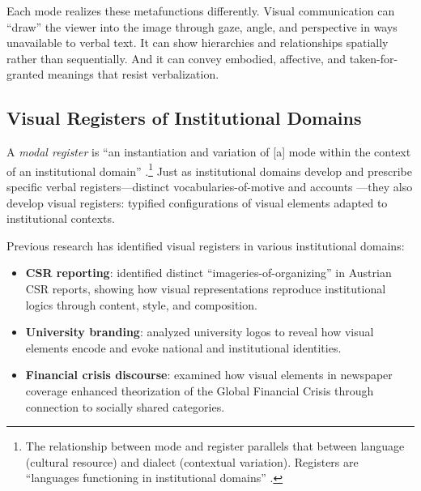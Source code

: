\documentclass[../main.tex]{subfiles}
\begin{document}
Each mode realizes these metafunctions differently. Visual communication can ``draw'' the viewer into the image through gaze, angle, and perspective in ways unavailable to verbal text. It can show hierarchies and relationships spatially rather than sequentially. And it can convey embodied, affective, and taken-for-granted meanings that resist verbalization.

\subsection{Visual Registers of Institutional Domains}

A \textit{modal register} is ``an instantiation and variation of [a] mode within the context of an institutional domain'' \cite[p.~90]{jancsary2018institutions}.\footnote{The relationship between mode and register parallels that between language (cultural resource) and dialect (contextual variation). Registers are ``languages functioning in institutional domains'' \cite{matthiessen2015register}.} Just as institutional domains develop and prescribe specific verbal registers---distinct vocabularies-of-motive \cite{mills1940situated} and accounts \cite{scott1968accounts}---they also develop visual registers: typified configurations of visual elements adapted to institutional contexts.

Previous research has identified visual registers in various institutional domains:

\begin{itemize}
    \item \textbf{CSR reporting}: \cite{hollerer2013imageries} identified distinct ``imageries-of-organizing'' in Austrian CSR reports, showing how visual representations reproduce institutional logics through content, style, and composition.
    \item \textbf{University branding}: \cite{delmestri2015unbearable, drori2016iconography} analyzed university logos to reveal how visual elements encode and evoke national and institutional identities.
    \item \textbf{Financial crisis discourse}: \cite{hollerer2017picture} examined how visual elements in newspaper coverage enhanced theorization of the Global Financial Crisis through connection to socially shared categories.
\end{itemize}
\end{document}
